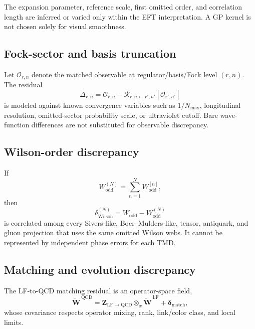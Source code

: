 \documentclass[11pt]{article}
\newcommand{\LF}{\ensuremath{\mathrm{LF}}}
\newcommand{\QCD}{\ensuremath{\mathrm{QCD}}}
\newcommand{\cO}{\mathcal O}
\newcommand{\cR}{\mathcal R}
\newcommand{\matchp}{\mathrm{match}}
\newcommand{\odd}{\mathrm{odd}}
\newcommand{\wil}{\mathrm{Wilson}}
\begin{document}
The expansion parameter, reference scale, first omitted order, and correlation
length are inferred or varied only within the EFT interpretation.  A GP
kernel is not chosen solely for visual smoothness.

\subsection{Fock-sector and basis truncation}

Let \(\cO_{r,n}\) denote the matched observable at regulator/basis/Fock level
\((r,n)\).  The residual
\begin{equation}
 \Delta_{r,n}
 =
 \cO_{r,n}
 -
 \cR_{r,n\leftarrow r',n'}[\cO_{r',n'}]
 \label{eq:fock-basis-residual}
\end{equation}
is modeled against known convergence variables such as \(1/N_{\max}\),
longitudinal resolution, omitted-sector probability scale, or ultraviolet
cutoff.  Bare wave-function differences are not substituted for observable
discrepancy.

\subsection{Wilson-order discrepancy}

If
\begin{equation}
 W_{\odd}^{(N)}
 =
 \sum_{n=1}^{N}W_{\odd}^{[n]},
 \label{eq:wilson-order-series}
\end{equation}
then
\begin{equation}
 \delta_{\wil}^{(N)}
 =
 W_{\odd}-W_{\odd}^{(N)}
 \label{eq:wilson-remainder}
\end{equation}
is correlated among every Sivers-like, Boer--Mulders-like, tensor, antiquark,
and gluon projection that uses the same omitted Wilson webs.  It cannot be
represented by independent phase errors for each TMD.

\subsection{Matching and evolution discrepancy}

The LF-to-QCD matching residual is an operator-space field,
\begin{equation}
 \widetilde{\bm W}^{\,\QCD}
 =
 \bm Z_{\LF\to\QCD}
 \otimes_x
 \widetilde{\bm W}^{\,\LF}
 +
 \bm\delta_{\matchp},
 \label{eq:matching-discrepancy}
\end{equation}
whose covariance respects operator mixing, rank, link/color class, and local
limits.
\end{document}
